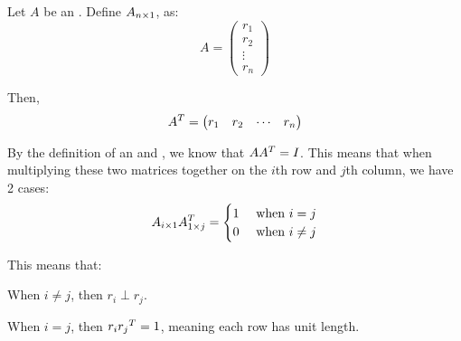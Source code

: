 \begin{blackbox}
  Let $A$ be an .
  Define $A_{n \times 1}$, as:
  \begin{equation*}
    A =
    \begin{pmatrix}
      r_{1} \\ r_{2} \\ \vdots \\ r_{n}
    \end{pmatrix}
  \end{equation*}

  Then,
  \begin{equation*}
    {A}^{T} =
    \begin{pmatrix}
      r_{1} & r_{2} & \cdots & r_{n}
    \end{pmatrix}
  \end{equation*}

  By the definition of an  and , we know that $A {A}^{T} = I$.
  This means that when multiplying these two matrices together on the $i$th row and $j$th column, we have 2 cases:
  \begin{equation*}
    A_{i \times 1} {A}^{T}_{1 \times j} =
    \begin{cases}
      1 & \text{ when } i = j \\
      0 & \text{ when } i \neq j
    \end{cases}
  \end{equation*}

  This means that:
  \begin{description}[noitemsep]
  \item When $i \neq j$, then $r_{i} \perp r_{j}$.
  \item When $i = j$, then $r_{i} {r_{j}}^{T} = 1$, meaning each row has unit length.
  \end{description}
\end{blackbox}


